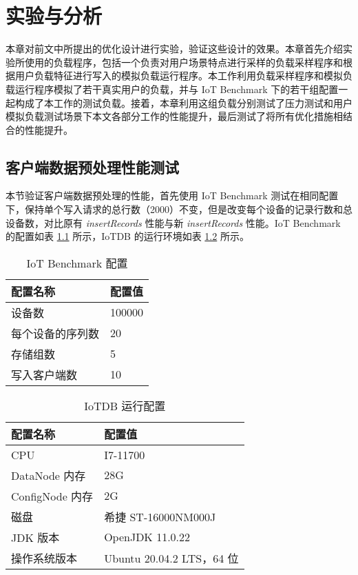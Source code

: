 
\chapter{实验与分析\label{sec:chap8}}
本章对前文中所提出的优化设计进行实验，验证这些设计的效果。本章首先介绍实验所使用的负载程序，包括一个负责对用户场景特点进行采样的负载采样程序和根据用户负载特征进行写入的模拟负载运行程序。本工作利用负载采样程序和模拟负载运行程序模拟了若干真实用户的负载，并与 IoT Benchmark\cite{liu2019benchmarking} 下的若干组配置一起构成了本工作的测试负载。接着，本章利用这组负载分别测试了压力测试和用户模拟负载测试场景下本文各部分工作的性能提升，最后测试了将所有优化措施相结合的性能提升。
\section{客户端数据预处理性能测试}
本节验证客户端数据预处理的性能，首先使用 IoT Benchmark 测试在相同配置下，保持单个写入请求的总行数（2000）不变，但是改变每个设备的记录行数和总设备数，对比原有 \emph{insertRecords} 性能与新 \emph{insertRecords} 性能。IoT Benchmark 的配置如表 \ref{tabular:iot-benchmark-config-end} 所示，IoTDB 的运行环境如表 \ref{tabular:iotdb-runtime-config} 所示。 
\begin{table}
  \centering
  \caption{IoT Benchmark 配置}
  \begin{tabular}{ll}
    \toprule
    配置名称 & 配置值 \\
    \midrule 
    设备数 & 100000 \\
    每个设备的序列数 & 20 \\
    存储组数 & 5 \\
    写入客户端数 & 10 \\
    \bottomrule
  \end{tabular}
  \label{tabular:iot-benchmark-config-end}
\end{table}

\begin{table}
  \centering
  \caption{IoTDB 运行配置}
  \begin{tabular}{ll}
    \toprule
    配置名称 & 配置值 \\
    \midrule 
    CPU & I7-11700 \\
    DataNode 内存 & 28G \\
    ConfigNode 内存 & 2G \\
     磁盘 & 希捷 ST-16000NM000J \\
    JDK 版本 & OpenJDK 11.0.22 \\
    操作系统版本 & Ubuntu 20.04.2 LTS，64 位 \\
    \bottomrule
  \end{tabular}
  \label{tabular:iotdb-runtime-config}
\end{table}

